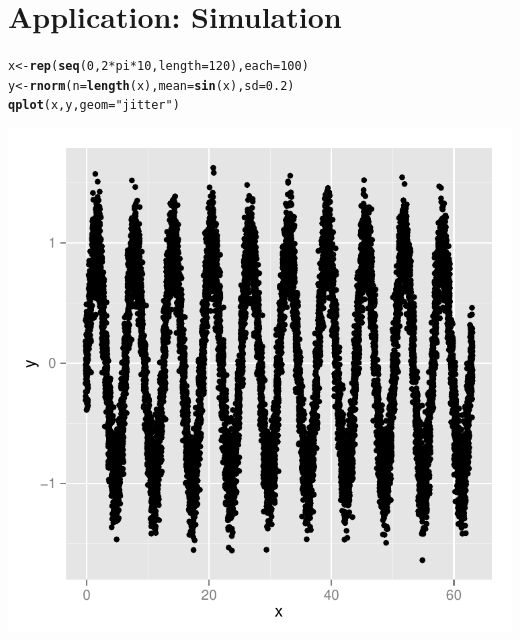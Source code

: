 \documentclass[11pt]{article}\usepackage{graphicx, color}
\makeatletter
\def\maxwidth{ %
  \ifdim\Gin@nat@width>\linewidth
    \linewidth
  \else
    \Gin@nat@width
  \fi
}
\newcommand{\hlfunctioncall}[1]{\textcolor[rgb]{0.501960784313725,0,0.329411764705882}{\textbf{#1}}}%
\newcommand{\hlstring}[1]{\textcolor[rgb]{0.6,0.6,1}{#1}}%
\newenvironment{kframe}{%
 \def\at@end@of@kframe{}%
 \ifinner\ifhmode%
  \def\at@end@of@kframe{\end{minipage}}%
  \begin{minipage}{\columnwidth}%
 \fi\fi%
 \def\FrameCommand##1{\hskip\@totalleftmargin \hskip-\fboxsep
 \colorbox{shadecolor}{##1}\hskip-\fboxsep
     \hskip-\linewidth \hskip-\@totalleftmargin \hskip\columnwidth}%
 \MakeFramed {\advance\hsize-\width
   \@totalleftmargin\z@ \linewidth\hsize
   \@setminipage}}%
 {\par\unskip\endMakeFramed%
 \at@end@of@kframe}
\newenvironment{knitrout}{}{} %
\makeatother
\begin{document}
\section{Application: Simulation}
\begin{knitrout}
\color{fgcolor}\begin{kframe}
\begin{alltt}
x <- \hlfunctioncall{rep}(\hlfunctioncall{seq}(0, 2 * pi * 10, length = 120), each = 100)
y <- \hlfunctioncall{rnorm}(n = \hlfunctioncall{length}(x), mean = \hlfunctioncall{sin}(x), sd = 0.2)
\hlfunctioncall{qplot}(x, y, geom = \hlstring{"jitter"})
\end{alltt}
\end{kframe}

{\centering \includegraphics[width=\maxwidth]{figure/fig-sine} 

}



\end{knitrout}
\end{document}
